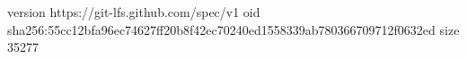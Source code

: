 version https://git-lfs.github.com/spec/v1
oid sha256:55cc12bfa96ec74627ff20b8f42ec70240ed1558339ab780366709712f0632ed
size 35277
